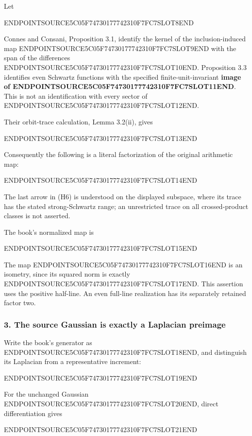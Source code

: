 Let

ENDPOINTSOURCE5C05F74730177742310F7FC7SLOT8END

Connes and Consani, Proposition 3.1, identify the kernel of the inclusion-induced map ENDPOINTSOURCE5C05F74730177742310F7FC7SLOT9END with the span of the differences ENDPOINTSOURCE5C05F74730177742310F7FC7SLOT10END. Proposition 3.3 identifies even Schwartz functions with the specified finite-unit-invariant \textbf{image of ENDPOINTSOURCE5C05F74730177742310F7FC7SLOT11END}. This is not an identification with every sector of ENDPOINTSOURCE5C05F74730177742310F7FC7SLOT12END.

Their orbit-trace calculation, Lemma 3.2(ii), gives

ENDPOINTSOURCE5C05F74730177742310F7FC7SLOT13END

Consequently the following is a literal factorization of the original arithmetic map:

ENDPOINTSOURCE5C05F74730177742310F7FC7SLOT14END

The last arrow in (H6) is understood on the displayed subspace, where its trace has the stated strong-Schwartz range; an unrestricted trace on all crossed-product classes is not asserted.

The book's normalized map is

ENDPOINTSOURCE5C05F74730177742310F7FC7SLOT15END

The map ENDPOINTSOURCE5C05F74730177742310F7FC7SLOT16END is an isometry, since its squared norm is exactly ENDPOINTSOURCE5C05F74730177742310F7FC7SLOT17END. This assertion uses the positive half-line. An even full-line realization has its separately retained factor two.

\subsubsection{3. The source Gaussian is exactly a Laplacian preimage}\label{endpoint-cc_hochschild--the-source-gaussian-is-exactly-a-laplacian-preimage}

Write the book's generator as ENDPOINTSOURCE5C05F74730177742310F7FC7SLOT18END, and distinguish its Laplacian from a representative increment:

ENDPOINTSOURCE5C05F74730177742310F7FC7SLOT19END

For the unchanged Gaussian ENDPOINTSOURCE5C05F74730177742310F7FC7SLOT20END, direct differentiation gives

ENDPOINTSOURCE5C05F74730177742310F7FC7SLOT21END

